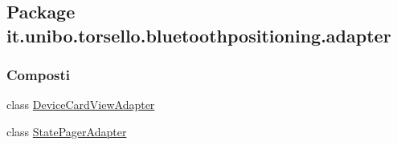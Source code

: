 \hypertarget{namespaceit_1_1unibo_1_1torsello_1_1bluetoothpositioning_1_1adapter}{}\subsection{Package it.\+unibo.\+torsello.\+bluetoothpositioning.\+adapter}
\label{namespaceit_1_1unibo_1_1torsello_1_1bluetoothpositioning_1_1adapter}
\subsubsection*{Composti}
\begin{DoxyCompactItemize}
\item 
class \hyperlink{classit_1_1unibo_1_1torsello_1_1bluetoothpositioning_1_1adapter_1_1DeviceCardViewAdapter}{Device\+Card\+View\+Adapter}
\item 
class \hyperlink{classit_1_1unibo_1_1torsello_1_1bluetoothpositioning_1_1adapter_1_1StatePagerAdapter}{State\+Pager\+Adapter}
\end{DoxyCompactItemize}

